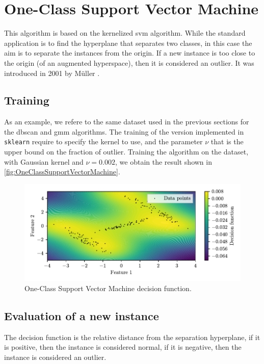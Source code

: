 \section{One-Class Support Vector Machine}
\label{sec:OneClassSupportVectorMachine}

This algorithm is based on the kernelized \gls{svm} algorithm. While the standard application is to find the hyperplane that separates two classes, in this case the aim is to separate the instances from the origin. If a new instance is too close to the origin (of an augmented hyperspace), then it is considered an outlier. It was introduced in 2001 by M\"{u}ller \cite{mullerOneClassSVM}.

\subsection{Training}
As an example, we refere to the same dataset used in the previous sections for the \gls{dbscan} and {\gls{gmm}} algorithms. The training of the version implemented in \texttt{sklearn} require to specify the kernel to use, and the parameter $\nu$ that is the upper bound on the fraction of outlier. Training the algorithm on the dataset, with Gaussian kernel and $\nu=0.002$, we obtain the result shown in \autoref{fig:OneClassSupportVectorMachine}. 

\begin{figure}
    \centering
    \includegraphics{images/nuSVM/Figure_1.pdf}
    \caption{One-Class Support Vector Machine decision function.}
    \label{fig:OneClassSupportVectorMachine}
\end{figure}

\subsection{Evaluation of a new instance}
The decision function is the relative distance from the separation hyperplane, if it is positive, then the instance is considered normal, if it is negative, then the instance is considered an outlier. 

